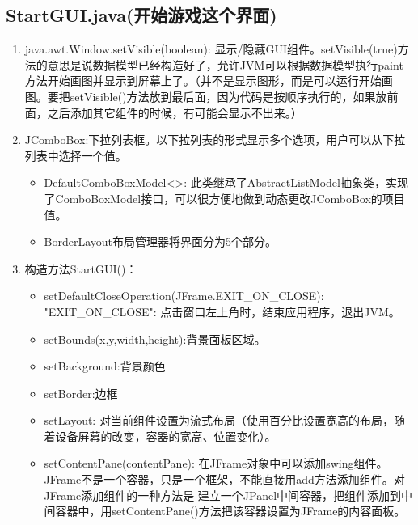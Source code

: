 \documentclass{ctexart}
\begin{document}
\subsection{StartGUI.java(开始游戏这个界面)}
\begin{enumerate}
    \item java.awt.Window.setVisible(boolean): 显示/隐藏GUI组件。setVisible(true)方法的意思是说数据模型已经构造好了，允许JVM可以根据数据模型执行paint方法开始画图并显示到屏幕上了。（并不是显示图形，而是可以运行开始画图。要把setVisible()方法放到最后面，因为代码是按顺序执行的，如果放前面，之后添加其它组件的时候，有可能会显示不出来。）
    \item JComboBox:下拉列表框。以下拉列表的形式显示多个选项，用户可以从下拉列表中选择一个值。
    \begin{itemize}
        \item DefaultComboBoxModel<>: 此类继承了AbstractListModel抽象类，实现了ComboBoxModel接口，可以很方便地做到动态更改JComboBox的项目值。
        \item BorderLayout布局管理器将界面分为5个部分。
    \end{itemize}
    \item 构造方法StartGUI()：
    \begin{itemize}
        \item setDefaultCloseOperation(JFrame.EXIT\_ON\_CLOSE): "EXIT\_ON\_CLOSE": 点击窗口左上角时，结束应用程序，退出JVM。
        \item setBounds(x,y,width,height):背景面板区域。
        \item setBackground:背景颜色
        \item setBorder:边框
        \item setLayout: 对当前组件设置为流式布局（使用百分比设置宽高的布局，随着设备屏幕的改变，容器的宽高、位置变化）。
        \item setContentPane(contentPane): 在JFrame对象中可以添加swing组件。JFrame不是一个容器，只是一个框架，不能直接用add方法添加组件。对JFrame添加组件的一种方法是 建立一个JPanel中间容器，把组件添加到中间容器中，用setContentPane()方法把该容器设置为JFrame的内容面板。
    \end{itemize}
\end{enumerate}
\end{document}
